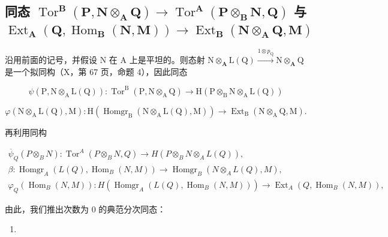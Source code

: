\subsection{\texorpdfstring{同态 \(\operatorname{Tor}^{\mathbf{B}}(\mathbf{P},\mathbf{N}\otimes_{\mathbf{A}}\mathbf{Q})\to \operatorname{Tor}^{\mathbf{A}}(\mathbf{P}\otimes_{\mathbf{B}}\mathbf{N},\mathbf{Q})\) 与 \(\operatorname{Ext}_{\mathbf{A}}(\mathbf{Q},\operatorname{Hom}_{\mathbf{B}}(\mathbf{N},\mathbf{M}))\to \operatorname{Ext}_{\mathbf{B}}(\mathbf{N}\otimes_{\mathbf{A}}\mathbf{Q},\mathbf{M})\)}{Tor 与 Ext 的换环同态}}

沿用前面的记号，并假设 N 在 A 上是平坦的。则态射 \(\mathrm{N}\otimes_{\mathbf{A}}\mathrm{L}(\mathrm{Q})\xrightarrow{\mathrm{1}\otimes p_{\mathrm{Q}}} \mathrm{N}\otimes_{\mathbf{A}}\mathrm{Q}\) 是一个拟同构（X，第 67 页，命题 4），因此同态

\[
\psi (\mathrm{P}, \mathrm{N} \otimes_ {\mathrm{A}} \mathrm{L} (\mathrm{Q})): \operatorname{Tor} ^ {\mathrm{B}} (\mathrm{P}, \mathrm{N} \otimes_ {\mathrm{A}} \mathrm{Q}) \rightarrow \mathrm{H} (\mathrm{P} \otimes_ {\mathrm{B}} \mathrm{N} \otimes_ {\mathrm{A}} \mathrm{L} (\mathrm{Q}))
\]

\[
\varphi (\mathrm{N} \otimes_ {\mathrm{A}} \mathrm{L} (\mathrm{Q}), \mathrm{M}): \mathrm{H} (\operatorname{Homgr} _ {\mathrm{B}} (\mathrm{N} \otimes_ {\mathrm{A}} \mathrm{L} (\mathrm{Q}), \mathrm{M})) \rightarrow \operatorname{Ext} _ {\mathrm{B}} (\mathrm{N} \otimes_ {\mathrm{A}} \mathrm{Q}, \mathrm{M}).
\]

再利用同构

\[
\begin{array}{c} \overline {{\psi}} _ {Q} (P \otimes_ {B} N): \operatorname{Tor} ^ {A} (P \otimes_ {B} N, Q) \to H (P \otimes_ {B} N \otimes_ {A} L (Q)), \\ \beta : \operatorname{Homgr} _ {A} (L (Q), \operatorname{Hom} _ {B} (N, M)) \to \operatorname{Homgr} _ {B} (N \otimes_ {A} L (Q), M), \\ \varphi_ {Q} (\operatorname{Hom} _ {B} (N, M)): H (\operatorname{Homgr} _ {A} (L (Q), \operatorname{Hom} _ {B} (N, M))) \to \operatorname{Ext} _ {A} (Q, \operatorname{Hom} _ {B} (N, M)), \end{array}
\]

由此，我们推出次数为 0 的典范分次同态：

\begin{enumerate}
\def\labelenumi{(\arabic{enumi})}
\setcounter{enumi}{10}
\tightlist
\item
\end{enumerate}

